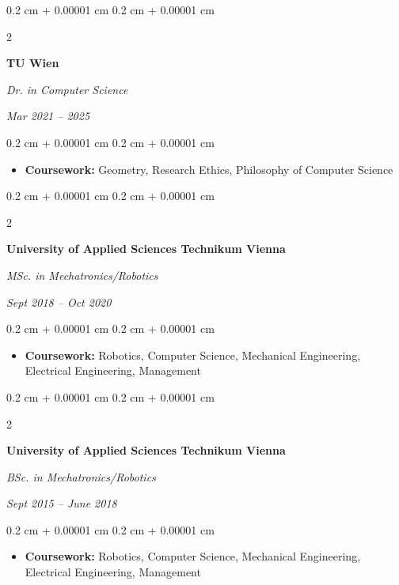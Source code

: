 \documentclass[10pt, letterpaper]{article}
\newenvironment{highlights}{
    \begin{itemize}[
        topsep=0.10 cm,
        parsep=0.10 cm,
        partopsep=0pt,
        itemsep=0pt,
        leftmargin=0.4 cm + 10pt
    ]
}{
    \end{itemize}
} %
\newenvironment{onecolentry}{
    \begin{adjustwidth}{
        0.2 cm + 0.00001 cm
    }{
        0.2 cm + 0.00001 cm
    }
}{
    \end{adjustwidth}
} %
\newenvironment{twocolentry}[2][]{
    \onecolentry
    \def\secondColumn{#2}
    \setcolumnwidth{\fill, 4.5 cm}
    \begin{paracol}{2}
}{
    \switchcolumn \raggedleft \secondColumn
    \end{paracol}
    \endonecolentry
} %
\begin{document}
        
        \begin{twocolentry}{
            
            
        \textit{Mar 2021 – 2025}}
            \textbf{TU Wien}

            \textit{Dr. in Computer Science}
        \end{twocolentry}

        \vspace{0.10 cm}
        \begin{onecolentry}
            \begin{highlights}
                \item \textbf{Coursework:} Geometry, Research Ethics, Philosophy of Computer Science
            \end{highlights}
        \end{onecolentry}


        \vspace{0.2 cm}

        \begin{twocolentry}{
            
            
        \textit{Sept 2018 – Oct 2020}}
            \textbf{University of Applied Sciences Technikum Vienna}

            \textit{MSc. in Mechatronics/Robotics}
        \end{twocolentry}

        \vspace{0.10 cm}
        \begin{onecolentry}
            \begin{highlights}
                \item \textbf{Coursework:} Robotics, Computer Science, Mechanical Engineering, Electrical Engineering, Management
            \end{highlights}
        \end{onecolentry}


        \vspace{0.2 cm}

        \begin{twocolentry}{
            
            
        \textit{Sept 2015 – June 2018}}
            \textbf{University of Applied Sciences Technikum Vienna}

            \textit{BSc. in Mechatronics/Robotics}
        \end{twocolentry}

        \vspace{0.10 cm}
        \begin{onecolentry}
            \begin{highlights}
                \item \textbf{Coursework:} Robotics, Computer Science, Mechanical Engineering, Electrical Engineering, Management
            \end{highlights}
        \end{onecolentry}
\end{document}
